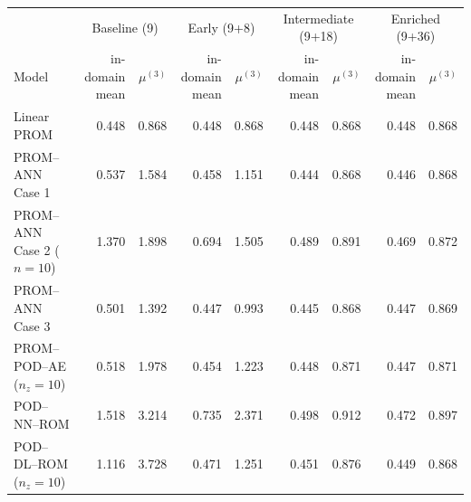 \begin{tabular}{lrr|rr|rr|rr}
\toprule
& \multicolumn{2}{c|}{Baseline (9)} & \multicolumn{2}{c|}{Early (9+8)} & \multicolumn{2}{c|}{Intermediate (9+18)} & \multicolumn{2}{c}{Enriched (9+36)} \\
Model & \shortstack{in-domain\\mean} & $\mu^{(3)}$ & \shortstack{in-domain\\mean} & $\mu^{(3)}$ & \shortstack{in-domain\\mean} & $\mu^{(3)}$ & \shortstack{in-domain\\mean} & $\mu^{(3)}$ \\
\midrule
Linear PROM & 0.448 & 0.868 & 0.448 & 0.868 & 0.448 & 0.868 & 0.448 & 0.868 \\
PROM--ANN Case 1 & 0.537 & 1.584 & 0.458 & 1.151 & 0.444 & 0.868 & 0.446 & 0.868 \\
PROM--ANN Case 2 ($n=10$) & 1.370 & 1.898 & 0.694 & 1.505 & 0.489 & 0.891 & 0.469 & 0.872 \\
PROM--ANN Case 3 & 0.501 & 1.392 & 0.447 & 0.993 & 0.445 & 0.868 & 0.447 & 0.869 \\
PROM--POD--AE ($n_z=10$) & 0.518 & 1.978 & 0.454 & 1.223 & 0.448 & 0.871 & 0.447 & 0.871 \\
\midrule
POD--NN--ROM & 1.518 & 3.214 & 0.735 & 2.371 & 0.498 & 0.912 & 0.472 & 0.897 \\
POD--DL--ROM ($n_z=10$) & 1.116 & 3.728 & 0.471 & 1.251 & 0.451 & 0.876 & 0.449 & 0.868 \\
\bottomrule
\end{tabular}
